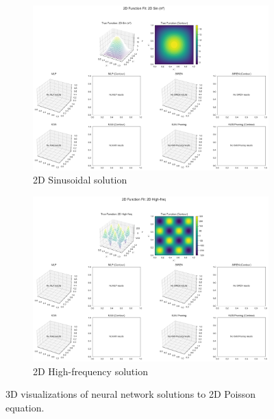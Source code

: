 \documentclass[11pt,a4paper]{article}
\begin{document}
\begin{figure}[htbp]
\centering
\begin{subfigure}{0.48\textwidth}
\includegraphics[width=\textwidth]{../section1/analysis/section1_complete_analysis_20251021_143055/section1_3_analysis/02_function_fitting/function_fit_dataset_0_2D_Sin_(π²).png}
\caption{2D Sinusoidal solution}
\end{subfigure}
\hfill
\begin{subfigure}{0.48\textwidth}
\includegraphics[width=\textwidth]{../section1/analysis/section1_complete_analysis_20251021_143055/section1_3_analysis/02_function_fitting/function_fit_dataset_2_2D_High-freq.png}
\caption{2D High-frequency solution}
\end{subfigure}
\caption{3D visualizations of neural network solutions to 2D Poisson equation.}
\label{fig:s13_surfaces}
\end{figure}
\end{document}
